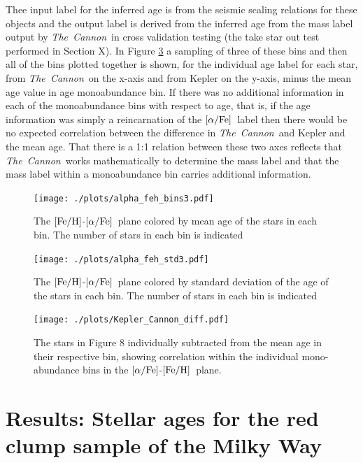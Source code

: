 \documentclass[12pt, preprint]{aastex}
\newcommand{\project}[1]{\textsl{#1}}
\newcommand{\tc}{\project{The~Cannon}}
\newcommand{\feh}{\mbox{$\rm [Fe/H]$}}
\newcommand{\alphafe}{\mbox{$\rm [\alpha/Fe]$}}
\begin{document}
Thee input label for the inferred age is from the seismic scaling relations for these objects and the output label is derived from the inferred age from the mass label output by \tc\ in cross validation testing (the take star out test performed in Section X). In Figure \ref{fig:alphabins} a sampling of three of these bins and then all of the bins plotted together is shown, for the individual age label for each star, from \tc\ on the x-axis and from Kepler on the y-axis, minus the mean age value in age monoabundance bin. If there was no additional information in each of the monoabundance bins with respect to age, that is, if the age information was simply a reincarnation of the \alphafe\ label then there would be no expected correlation between the difference in \tc\ and Kepler and the mean age. That there is a 1:1 relation between these two axes reflects that \tc\ works mathematically to determine the mass label and that the mass label within a monoabundance bin carries additional information.

\begin{figure}[p!]
\centering
 \texttt{[image: ./plots/alpha\_feh\_bins3.pdf]}
    \caption{The \feh-\alphafe\ plane colored by mean age of the stars in each bin. The number of stars in each bin is indicated }
\label{fig:alphabins}
\end{figure}

\begin{figure}[p!]
\centering
 \texttt{[image: ./plots/alpha\_feh\_std3.pdf]}
    \caption{The \feh-\alphafe\ plane colored by standard deviation of the age of the stars in each bin. The number of stars in each bin is indicated }
\label{fig:alphabins}
\end{figure}

\begin{figure}[p!]
\centering
 \texttt{[image: ./plots/Kepler\_Cannon\_diff.pdf]}
    \caption{The stars in Figure 8 individually subtracted from the mean age in their respective bin, showing correlation within the individual mono-abundance bins in the \alphafe-\feh\ plane. }
\label{fig:alphabins}
\end{figure}

\section{Results: Stellar ages for the red clump sample of the Milky Way}
\end{document}
